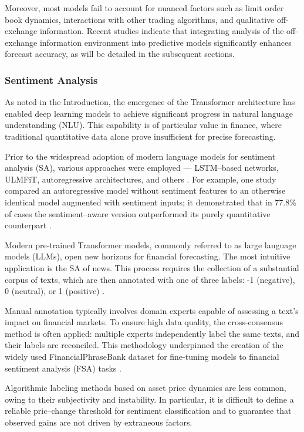 Moreover, most models fail to account for nuanced factors such as limit order book dynamics,
interactions with other trading algorithms, and qualitative off-exchange information. Recent
studies indicate that integrating analysis of the off-exchange information environment into
predictive models significantly enhances forecast accuracy, as will be detailed in the subsequent
sections.

\subsubsection{Sentiment Analysis}
As noted in the Introduction, the emergence of the Transformer architecture has enabled deep learning
models to achieve significant progress in natural language understanding (NLU). This capability
is of particular value in finance, where traditional quantitative data alone prove insufficient
for precise forecasting.

Prior to the widespread adoption of modern language models for sentiment analysis (SA), various
approaches were employed --- LSTM--based networks, ULMFiT, autoregressive architectures, and others
\parencite{Hochreiter1997LSTM, howard2018ULMFIT}. For example, one study compared an autoregressive
model without sentiment features to an otherwise identical model augmented with sentiment inputs;
it demonstrated that in 77.8\% of cases the sentiment--aware version outperformed its purely
quantitative counterpart \parencite{NNAR2019}.

Modern pre-trained Transformer models, commonly referred to as large language models (LLMs),
open new horizons for financial forecasting. The most intuitive application is the SA of news.
This process requires the collection of a substantial corpus of texts, which are then annotated
with one of three labels: -1 (negative), 0 (neutral), or 1 (positive) \parencite{SA2020taxonomy}.

Manual annotation typically involves domain experts capable of assessing a text's impact on financial
markets. To ensure high data quality, the cross-consensus method \parencite{consensus1997bogdan}
is often applied: multiple experts independently label the same texts, and their labels
are reconciled. This methodology underpinned the creation of the widely used FinancialPhraseBank
dataset for fine-tuning models to financial sentiment analysis (FSA) tasks \parencite{Malo2014FPB}.

Algorithmic labeling methods based on asset price dynamics are less common, owing to their
subjectivity and instability. In particular, it is difficult to define a reliable pric--change
threshold for sentiment classification and to guarantee that observed gains are not driven
by extraneous factors.

